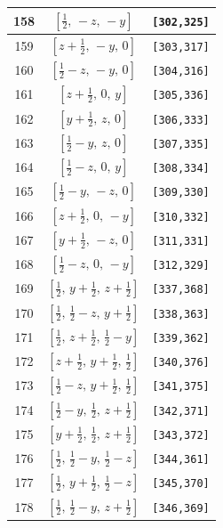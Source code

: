 \documentclass[fleqn,8pt]{jsarticle}
\begin{document}
\begin{longtable}{ccc}
158 & $\left[ \frac{1}{2},\, - z,\, - y \right]$ & {\tt [302,325]} \\ \hline
159 & $\left[ z + \frac{1}{2},\, - y,\, 0 \right]$ & {\tt [303,317]} \\ \hline
160 & $\left[ \frac{1}{2} - z,\, - y,\, 0 \right]$ & {\tt [304,316]} \\ \hline
161 & $\left[ z + \frac{1}{2},\, 0,\, y \right]$ & {\tt [305,336]} \\ \hline
162 & $\left[ y + \frac{1}{2},\, z,\, 0 \right]$ & {\tt [306,333]} \\ \hline
163 & $\left[ \frac{1}{2} - y,\, z,\, 0 \right]$ & {\tt [307,335]} \\ \hline
164 & $\left[ \frac{1}{2} - z,\, 0,\, y \right]$ & {\tt [308,334]} \\ \hline
165 & $\left[ \frac{1}{2} - y,\, - z,\, 0 \right]$ & {\tt [309,330]} \\ \hline
166 & $\left[ z + \frac{1}{2},\, 0,\, - y \right]$ & {\tt [310,332]} \\ \hline
167 & $\left[ y + \frac{1}{2},\, - z,\, 0 \right]$ & {\tt [311,331]} \\ \hline
168 & $\left[ \frac{1}{2} - z,\, 0,\, - y \right]$ & {\tt [312,329]} \\ \hline
169 & $\left[ \frac{1}{2},\, y + \frac{1}{2},\, z + \frac{1}{2} \right]$ & {\tt [337,368]} \\ \hline
170 & $\left[ \frac{1}{2},\, \frac{1}{2} - z,\, y + \frac{1}{2} \right]$ & {\tt [338,363]} \\ \hline
171 & $\left[ \frac{1}{2},\, z + \frac{1}{2},\, \frac{1}{2} - y \right]$ & {\tt [339,362]} \\ \hline
172 & $\left[ z + \frac{1}{2},\, y + \frac{1}{2},\, \frac{1}{2} \right]$ & {\tt [340,376]} \\ \hline
173 & $\left[ \frac{1}{2} - z,\, y + \frac{1}{2},\, \frac{1}{2} \right]$ & {\tt [341,375]} \\ \hline
174 & $\left[ \frac{1}{2} - y,\, \frac{1}{2},\, z + \frac{1}{2} \right]$ & {\tt [342,371]} \\ \hline
175 & $\left[ y + \frac{1}{2},\, \frac{1}{2},\, z + \frac{1}{2} \right]$ & {\tt [343,372]} \\ \hline
176 & $\left[ \frac{1}{2},\, \frac{1}{2} - y,\, \frac{1}{2} - z \right]$ & {\tt [344,361]} \\ \hline
177 & $\left[ \frac{1}{2},\, y + \frac{1}{2},\, \frac{1}{2} - z \right]$ & {\tt [345,370]} \\ \hline
178 & $\left[ \frac{1}{2},\, \frac{1}{2} - y,\, z + \frac{1}{2} \right]$ & {\tt [346,369]} \\ \hline

\end{longtable}
\end{document}
